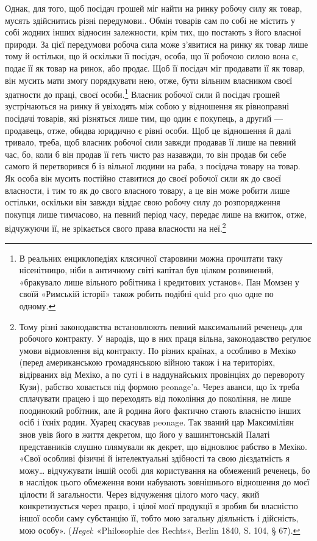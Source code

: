 Однак, для того, щоб посідач грошей міг найти на ринку
робочу силу як товар, мусять здійснитись різні передумови..
Обмін товарів сам по собі не містить у собі жодних інших відносин
залежности, крім тих, що постають з його власної природи.
За цієї передумови робоча сила може з’явитися на ринку як
товар лише тому й остільки, що й оскільки її посідач, особа, що
її робочою силою вона є, подає її як товар на ринок, або продає.
Щоб її посідач міг продавати її як товар, він мусить мати змогу
порядкувати нею, отже, бути вільним власником своєї здатности
до праці, своєї особи.\footnote{
В реальних енциклопедіях клясичної старовини можна прочитати
таку нісенітницю, ніби в античному світі капітал був цілком розвинений,
«бракувало лише вільного робітника і кредитових установ». Пан Момзен
у своїй «Римській історії» також робить подібні quid pro quo одне
по одному.
} Власник робочої сили й посідач грошей
зустрічаються на ринку й увіходять між собою у відношення
як рівноправні посідачі товарів, які різняться лише тим, що
один є покупець, а другий — продавець, отже, обидва юридично
є рівні особи. Щоб це відношення й далі тривало, треба, щоб
власник робочої сили завжди продавав її лише на певний час,
бо, коли б він продав її геть чисто раз назавжди, то він продав би
себе самого й перетворився б із вільної людини на раба, з посідача
товару на товар. Як особа він мусить постійно ставитися до
своєї робочої сили як до своєї власности, і тим то як до свого
власного товару, а це він може робити лише остільки, оскільки
він завжди віддає свою робочу силу до розпорядження покупця
лише тимчасово, на певний період часу, передає лише на вжиток,
отже, відчужуючи її, не зрікається свого права власности
на неї.\footnote{
Тому різні законодавства встановлюють певний максимальний реченець
для робочого контракту. У народів, що в них праця вільна, законодавство
реґулює умови відмовлення від контракту. По різних країнах, а особливо
в Мехіко (перед американською громадянською війною також і на територіях,
відірваних від Мехіко, а по суті і в наддунайських провінціях до
перевороту Кузи), рабство ховається під формою peonage’a. Через аванси,
що їх треба сплачувати працею і що переходять від покоління до покоління,
не лише поодинокий робітник, але й родина його фактично стають
власністю інших осіб і їхніх родин. Хуарец скасував peonage. Так званий
цар Максиміліян знов увів його в життя декретом, що його у вашинґтонській
Палаті представників слушно плямували як декрет, що відновлює
рабство в Мехіко. «Свої особливі фізичні й інтелектуальні здібності та
свою дієздатність я можу\dots{} відчужувати іншій особі для користування
на обмежений реченець, бо в наслідок цього обмеження вони набувають
зовнішнього відношення до моєї цілости й загальности. Через відчуження
цілого мого часу, який конкретизується через працю, і цілої моєї продукції
я зробив би власністю іншої особи саму субстанцію її, тобто мою загальну
діяльність і дійсність, мою особу». (\emph{Hegel}: «Philosophie des Rechts», Berlin
1840, S. 104, § 67).
}

